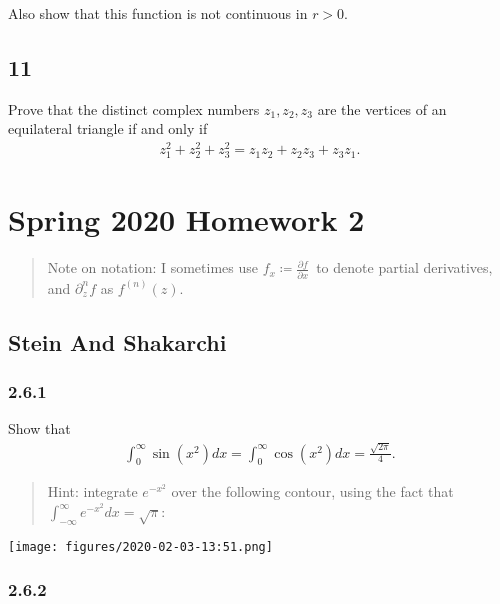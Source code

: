 Also show that this function is not continuous in \(r>0\).

\hypertarget{section-36}{%
\subsection{11}\label{section-36}}

Prove that the distinct complex numbers \(z_1, z_2, z_3\) are the
vertices of an equilateral triangle if and only if
\begin{align*}
z_{1}^{2}+z_{2}^{2}+z_{3}^{2}=z_{1} z_{2}+z_{2} z_{3}+z_{3} z_{1}
.\end{align*}

\hypertarget{spring-2020-homework-2}{%
\section{Spring 2020 Homework 2}\label{spring-2020-homework-2}}

\begin{quote}
Note on notation: I sometimes use
\(f_x \coloneqq{\frac{\partial f}{\partial x}\,}\) to denote partial
derivatives, and \({{\partial}}_z^n f\) as \(f^{(n)}(z)\).
\end{quote}

\hypertarget{stein-and-shakarchi}{%
\subsection{Stein And Shakarchi}\label{stein-and-shakarchi}}

\hypertarget{section-37}{%
\subsubsection{2.6.1}\label{section-37}}

Show that
\begin{align*}
\int_{0}^{\infty} \sin \left(x^{2}\right) d x=\int_{0}^{\infty} \cos \left(x^{2}\right) d x=\frac{\sqrt{2 \pi}}{4}
.\end{align*}

\begin{quote}
Hint: integrate \(e^{-x^2}\) over the following contour, using the fact
that \(\int_{-\infty}^{\infty} e^{-x^{2}} d x=\sqrt{\pi}\):
\end{quote}

\texttt{[image: figures/2020-02-03-13:51.png]}\\

\hypertarget{section-38}{%
\subsubsection{2.6.2}\label{section-38}}

